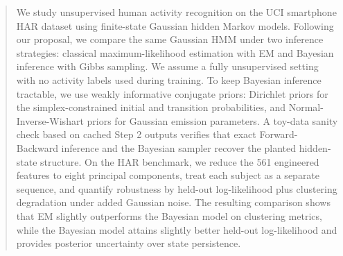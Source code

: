 \begin{abstract}
We study unsupervised human activity recognition on the UCI smartphone HAR dataset using finite-state Gaussian hidden Markov models. Following our proposal, we compare the same Gaussian HMM under two inference strategies: classical maximum-likelihood estimation with EM and Bayesian inference with Gibbs sampling. We assume a fully unsupervised setting with no activity labels used during training. To keep Bayesian inference tractable, we use weakly informative conjugate priors: Dirichlet priors for the simplex-constrained initial and transition probabilities, and Normal-Inverse-Wishart priors for Gaussian emission parameters. A toy-data sanity check based on cached Step 2 outputs verifies that exact Forward-Backward inference and the Bayesian sampler recover the planted hidden-state structure. On the HAR benchmark, we reduce the 561 engineered features to eight principal components, treat each subject as a separate sequence, and quantify robustness by held-out log-likelihood plus clustering degradation under added Gaussian noise. The resulting comparison shows that EM slightly outperforms the Bayesian model on clustering metrics, while the Bayesian model attains slightly better held-out log-likelihood and provides posterior uncertainty over state persistence.
\end{abstract}
